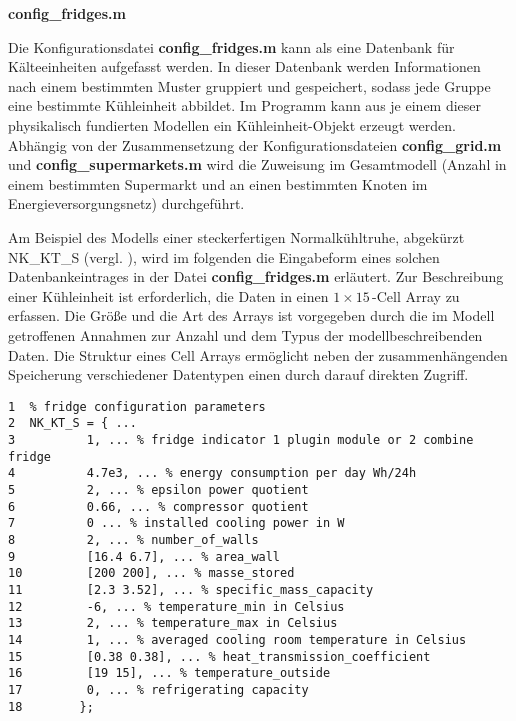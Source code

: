 \vspace{3mm}%
\noindent\textbf{config\_fridges.m}
\vspace{3mm}

Die Konfigurationsdatei \textbf{config\_fridges.m} kann als eine Datenbank für Kälteeinheiten aufgefasst werden. In dieser
Datenbank werden Informationen nach einem bestimmten Muster gruppiert und gespeichert, sodass jede Gruppe eine bestimmte
Kühleinheit abbildet. Im Programm kann aus je einem dieser physikalisch fundierten
Modellen ein Kühleinheit-Objekt erzeugt werden. Abhängig von der Zusammensetzung der
Konfigurationsdateien \textbf{config\_grid.m} und \textbf{config\_supermarkets.m} wird die Zuweisung im Gesamtmodell (Anzahl
in einem bestimmten Supermarkt und an einen bestimmten Knoten im Energieversorgungsnetz) durchgeführt.

Am Beispiel des Modells einer steckerfertigen Normalkühltruhe, abgekürzt NK\_KT\_S (vergl.
), wird im folgenden die Eingabeform eines solchen Datenbankeintrages in der Datei \textbf{config\_fridges.m}
erläutert. Zur Beschreibung einer Kühleinheit ist erforderlich, die Daten in einen $1\times15\,$-Cell Array zu erfassen.  Die
Größe und die Art des Arrays ist vorgegeben durch die im Modell getroffenen Annahmen zur Anzahl und dem
Typus der modellbeschreibenden Daten. Die Struktur eines Cell Arrays ermöglicht neben der zusammenhängenden Speicherung
verschiedener Datentypen einen durch \matlab darauf direkten Zugriff.

\begin{lstlisting}[caption=config\_fridges.m,label={fridge}]
1  % fridge configuration parameters
2  NK_KT_S = { ...
3          1, ... % fridge indicator 1 plugin module or 2 combine fridge
4          4.7e3, ... % energy consumption per day Wh/24h
5          2, ... % epsilon power quotient
6          0.66, ... % compressor quotient
7          0 ... % installed cooling power in W
8          2, ... % number_of_walls
9          [16.4 6.7], ... % area_wall
10         [200 200], ... % masse_stored
11         [2.3 3.52], ... % specific_mass_capacity
12         -6, ... % temperature_min in Celsius
13         2, ... % temperature_max in Celsius
14         1, ... % averaged cooling room temperature in Celsius
15         [0.38 0.38], ... % heat_transmission_coefficient
16         [19 15], ... % temperature_outside
17         0, ... % refrigerating capacity
18        };
\end{lstlisting}

